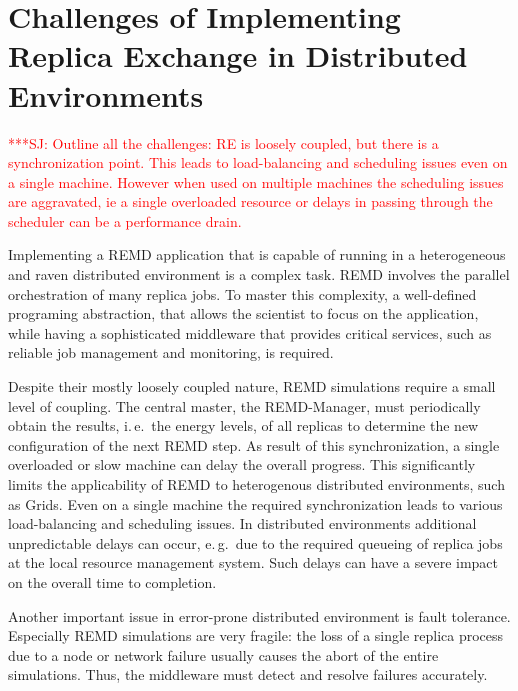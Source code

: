 \documentclass{rspublic}
\newcommand{\jhanote}[1]{ {\textcolor{red} { ***SJ: #1 }}}
\newcommand{\jhanote}[1]{}
\begin{document}

\section{Challenges of Implementing Replica Exchange in Distributed
  Environments}
\label{sec:challenges}
\jhanote{Outline all the challenges: RE is loosely coupled, but there
  is a synchronization point. This leads to load-balancing and
  scheduling issues even on a single machine. However when used on
  multiple machines the scheduling issues are aggravated, ie a single
  overloaded resource or delays in passing through the scheduler can
  be a performance drain.}                
                                               

Implementing a REMD application that is capable of running in a heterogeneous and 
raven distributed environment is a complex task. REMD involves the parallel orchestration of 
many replica jobs. To master this complexity, a well-defined programing
abstraction, that allows the scientist to focus on the application, while
having a sophisticated middleware that provides critical services, such as reliable 
job management and monitoring, is required.  

Despite their mostly loosely coupled nature, REMD simulations require a small level of coupling. 
The central master, the REMD-Manager, must periodically obtain the results, i.\,e.\ the energy levels,
of all replicas to determine the new configuration of the next REMD step. 
As result of this synchronization,  a single overloaded or slow machine can delay the overall
progress. This significantly limits the  applicability of REMD 
to heterogenous distributed environments, such as Grids.
Even on a single machine the required synchronization leads to various load-balancing 
and scheduling issues. In distributed environments additional unpredictable delays
can occur, e.\,g.\  due to the required queueing of replica jobs at the local
resource management system. Such delays can have a severe impact on the overall time to completion. 
                 
Another important issue in error-prone distributed environment is fault tolerance. 
Especially REMD simulations are very fragile: the loss of a single replica process due to a node 
or network failure usually causes the abort of the entire simulations. Thus, 
the middleware must detect and resolve failures accurately.
                                                                
\end{document}
